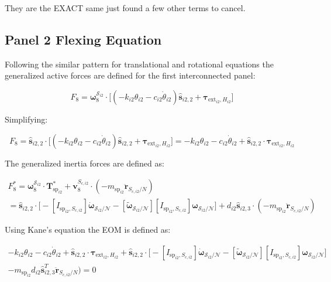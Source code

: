 \documentclass[paper]{aiaaNew}
\begin{document}
They are the EXACT same just found a few other terms to cancel.

\subsection{Panel 2 Flexing Equation}
Following the similar pattern for translational and rotational equations the generalized active forces are defined for the first interconnected panel:

\begin{equation}
F_{8} = \bm \omega_{8}^{\mathcal{S}_{i2}} \cdot \Big[  (-k_{i2} \theta_{i2} - c_{i2} \dot{\theta}_{i2})\bm{\hat{s}}_{i2,2} + \bm \tau_{\text{ext}_{i2},H_{i2}} \Big]
\end{equation}

Simplifying:

\begin{equation}
F_{8} = \bm{\hat{s}}_{i2,2} \cdot \Big[  (-k_{i2} \theta_{i2} - c_{i2} \dot{\theta}_{i2})\bm{\hat{s}}_{i2,2} + \bm \tau_{\text{ext}_{i2},H_{i2}} \Big] = -k_{i2} \theta_{i2} - c_{i2} \dot{\theta}_{i2} + \bm{\hat{s}}_{i2,2} \cdot \bm \tau_{\text{ext}_{i2},H_{i2}}
\end{equation}

The generalized inertia forces are defined as: 

\begin{multline}
F^*_{8} = \bm \omega_{\textit{8}}^{\mathcal{S}_{i2}} \cdot \bm T^*_{\text{sp}_{i2}}  + \bm v^{S_{c,i2}}_{8} \cdot (-m_{\text{sp}_{i2}} \ddot{\bm{r}}_{S_{c,i2}/N}) \\
= \bm{\hat{s}}_{i2,2} \cdot \Big[-[I_{\text{sp}_{i2},S_{c,i2}}] \dot{\bm\omega}_{\mathcal{S}_{i2}/\mathcal{N}}  -[\tilde{\bm \omega}_{\mathcal{S}_{i2}/\mathcal{N}}] [I_{\text{sp}_{i2},S_{c,i2}}] \bm \omega_{\mathcal{S}_{i2}/\mathcal{N}} \Big] + d_{i2}\bm{\hat{s}}_{i2,3} \cdot (-m_{\text{sp}_{i2}} \ddot{\bm{r}}_{S_{c,i2}/N})
\end{multline}

Using Kane's equation the EOM is defined as:

\begin{multline}
-k_{i2} \theta_{i2} - c_{i2} \dot{\theta}_{i2} + \bm{\hat{s}}_{i2,2} \cdot \bm \tau_{\text{ext}_{i2},H_{i2}} + \bm{\hat{s}}_{i2,2} \cdot \Big[-[I_{\text{sp}_{i2},S_{c,i2}}] \dot{\bm\omega}_{\mathcal{S}_{i2}/\mathcal{N}}  -[\tilde{\bm \omega}_{\mathcal{S}_{i2}/\mathcal{N}}] [I_{\text{sp}_{i2},S_{c,i2}}] \bm \omega_{\mathcal{S}_{i2}/\mathcal{N}} \Big] \\
- m_{\text{sp}_{i2}} d_{i2}\bm{\hat{s}}_{i2,3}^T \ddot{\bm{r}}_{S_{c,i2}/N}) = 0
\end{multline}
\end{document}
